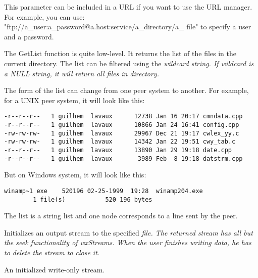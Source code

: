 This parameter can be included in a URL if you want to use the URL manager.
For example, you can use: "ftp://a_user:a_password@a.host:service/a_directory/a_
file"
to specify a user and a password.


The GetList function is quite low-level. It returns the list of the files in
the current directory. The list can be filtered using the \it{wildcard} string.
If \it{wildcard} is a NULL string, it will return all files in directory.

The form of the list can change from one peer system to another. For example,
for a UNIX peer system, it will look like this:
\begin{verbatim}
-r--r--r--   1 guilhem  lavaux      12738 Jan 16 20:17 cmndata.cpp
-r--r--r--   1 guilhem  lavaux      10866 Jan 24 16:41 config.cpp
-rw-rw-rw-   1 guilhem  lavaux      29967 Dec 21 19:17 cwlex_yy.c
-rw-rw-rw-   1 guilhem  lavaux      14342 Jan 22 19:51 cwy_tab.c
-r--r--r--   1 guilhem  lavaux      13890 Jan 29 19:18 date.cpp
-r--r--r--   1 guilhem  lavaux       3989 Feb  8 19:18 datstrm.cpp
\end{verbatim}

But on Windows system, it will look like this:
\begin{verbatim}
winamp~1 exe    520196 02-25-1999  19:28  winamp204.exe
        1 file(s)           520 196 bytes
\end{verbatim}

The list is a string list and one node corresponds to a line sent by the peer.




Initializes an output stream to the specified \it{file}. The returned
stream has all but the seek functionality of wxStreams. When the user finishes
writing data, he has to delete the stream to close it.


An initialized write-only stream.



